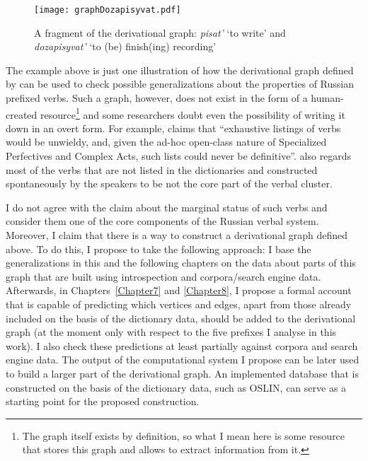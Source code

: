 \begin{figure}
\begin{center}
\texttt{[image: graphDozapisyvat.pdf]}
\caption{A fragment of the derivational graph: \textit{pisat'} `to write' and \textit{dozapisyvat'} `to (be) finish(ing) recording'\label{tree:dozapisyvat}}
\end{center}
\end{figure}			

The example above is just one illustration of how the derivational graph defined by  can be used to check possible generalizations about the properties of Russian prefixed verbs. Such a graph, however, does not exist in the form of a human-created resource\footnote{The graph itself exists by definition, so what I mean here is some resource that stores this graph and allows to extract information from it.} and some researchers doubt even the possibility of writing it down in an overt form. For example, \citet[625]{Janda:07a} claims that ``exhaustive listings of verbs would be unwieldy, and, given the ad-hoc open-class nature of Specialized Perfectives and Complex Acts, such lists could never be definitive''. \citet[626]{Janda:07a} also regards most of the verbs that are not listed in the dictionaries and constructed spontaneously by the speakers to be not the core part of the verbal cluster. 

I do not agree with the claim about the marginal status of such verbs and consider them one of the core components of the Russian verbal system. Moreover, I claim that there is a way to construct a derivational graph defined above. To do this, I propose to take the following approach: I base the generalizations in this and the following chapters on the data about parts of this graph that are built using introspection and corpora/search engine data. Afterwards, in Chapters~\ref{Chapter7} and \ref{Chapter8}, I propose a formal account that is capable of predicting which vertices and edges, apart from those already included on the basis of the dictionary data, should be added to the derivational graph (at the moment only with respect to the five prefixes I analyse in this work). I also check these predictions at least partially against corpora and search engine data. The output of the computational system I propose can be later used to build a larger part of the derivational graph. An implemented database that is constructed on the basis of the dictionary data, such as OSLIN, can serve as a starting point for the proposed construction.

